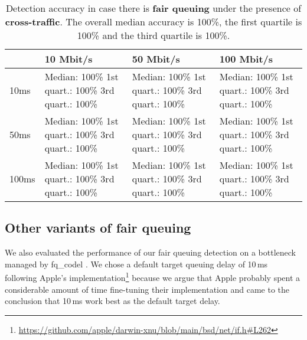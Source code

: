 \documentclass[conference]{IEEEtran}
\begin{document}
\begin{table}
\begin{tabularx}{\columnwidth}{| l | X | X | X |}
\hline
& 10 Mbit/s & 50 Mbit/s & 100 Mbit/s \\ \hline
10ms & Median: 100\% \newline 1st quart.: 100\% \newline 3rd quart.: 100\% & Median: 100\% \newline 1st quart.: 100\% \newline 3rd quart.: 100\% & Median: 100\% \newline 1st quart.: 100\% \newline 3rd quart.: 100\%\\ \hline
50ms & Median: 100\% \newline 1st quart.: 100\% \newline 3rd quart.: 100\% & Median: 100\% \newline 1st quart.: 100\% \newline 3rd quart.: 100\% & Median: 100\% \newline 1st quart.: 100\% \newline 3rd quart.: 100\% \\ \hline
100ms & Median: 100\% \newline 1st quart.: 100\% \newline 3rd quart.: 100\% & Median: 100\% \newline 1st quart.: 100\% \newline 3rd quart.: 100\% & Median: 100\% \newline 1st quart.: 100\% \newline 3rd quart.: 100\% \\ \hline
\end{tabularx}
\caption{Detection accuracy in case there is \textbf{fair queuing} under the presence of \textbf{cross-traffic}.  The overall median accuracy is 100\%, the first quartile is 100\% and the third quartile is 100\%.}
\label{table:fq_crosstraffic}
\end{table}        

\subsection{Other variants of fair queuing}

We also evaluated the performance of our fair queuing detection on a bottleneck managed by fq\_codel \cite{hoeiland-joergensen_flow_2018}. 
We chose a default target queuing delay of 10\,ms following Apple's implementation\footnote{
    \url{https://github.com/apple/darwin-xnu/blob/main/bsd/net/if.h\#L262}
} because we argue that Apple probably spent a considerable amount of time fine-tuning their implementation and 
came to the conclusion that 10\,ms work best as the default target delay. 
\end{document}
